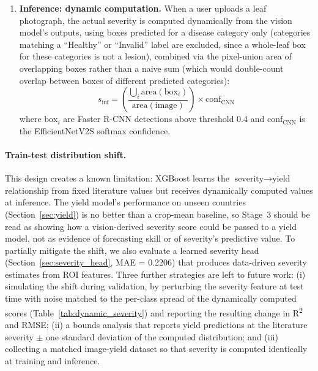 \begin{enumerate}
    \item \textbf{Inference: dynamic computation.}
    When a user uploads a leaf photograph, the actual severity is computed
    dynamically from the vision model's outputs, using boxes predicted
    for a disease category only (categories matching a ``Healthy'' or
    ``Invalid'' label are excluded, since a whole-leaf box for these
    categories is not a lesion), combined via the pixel-union area of
    overlapping boxes rather than a naive sum (which would double-count
    overlap between boxes of different predicted categories):
    \begin{equation}
    s_{\text{inf}} = \left(\frac{\bigcup_i \text{area}(\text{box}_i)}{\text{area}(\text{image})}\right) \times \text{conf}_{\text{CNN}}
    \label{eq:dynamic_severity}
    \end{equation}
    where $\text{box}_i$ are Faster R-CNN detections above threshold 0.4 and
    $\text{conf}_{\text{CNN}}$ is the EfficientNetV2S softmax confidence.
\end{enumerate}

\paragraph{Train-test distribution shift.}
This design creates a known limitation: XGBoost learns the
$\text{severity} \rightarrow \text{yield}$ relationship from fixed literature
values but receives dynamically computed values at inference. The yield
model's performance on unseen countries (Section~\ref{sec:yield}) is no
better than a crop-mean baseline, so Stage~3 should be read as showing how
a vision-derived severity score could be passed to a yield model, not as
evidence of forecasting skill or of severity's predictive value. To partially
mitigate the shift, we also evaluate a learned severity head
(Section~\ref{sec:severity_head}, MAE = 0.2206) that produces data-driven
severity estimates from ROI features. Three further strategies are left
to future work: (i) simulating the shift during validation, by
perturbing the severity feature at test time with noise matched to the
per-class spread of the dynamically computed scores
(Table~\ref{tab:dynamic_severity}) and reporting the resulting change
in R\textsuperscript{2} and RMSE; (ii) a bounds analysis that reports
yield predictions at the literature severity $\pm$ one standard
deviation of the computed distribution; and (iii) collecting a matched
image-yield dataset so that severity is computed identically at
training and inference.

